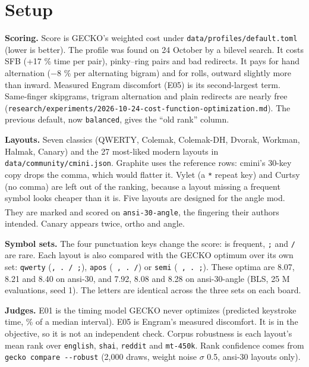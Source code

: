 \documentclass{gecko-paper}
\begin{document}
{\small
\section{Setup}

\textbf{Scoring.} Score is GECKO's weighted cost under \texttt{data/profiles/default.toml} (lower is better). The profile was found on 24 October by a bilevel search. It costs SFB (+17 \% time per pair), pinky–ring pairs and bad redirects. It pays for hand alternation ($-$8 \% per alternating bigram) and for rolls, outward slightly more than inward. Measured Engram discomfort (E05) is its
second-largest term. Same-finger skipgrams, trigram alternation and plain redirects are nearly free (\texttt{research/experiments/2026-10-24-cost-function-optimization.md}). The previous default, now \texttt{balanced}, gives the “old rank” column.

\textbf{Layouts.} Seven classics (QWERTY, Colemak, Colemak-DH, Dvorak, Workman, Halmak, Canary) and the 27 most-liked modern layouts in \texttt{data/community/cmini.json}. Graphite uses the reference rows: cmini's 30-key copy drops the comma, which would flatter it. Vylet (a \texttt{*} repeat key) and Curtsy (no comma) are left out of the ranking, because a layout missing a frequent symbol looks
cheaper than it is. Five layouts are designed for the angle mod. They are marked \textsuperscript{\dag} and scored on \texttt{ansi-30-angle}, the fingering their authors intended. Canary appears twice, ortho and angle.

\textbf{Symbol sets.} The four punctuation keys change the score: \texttt{\textquotesingle{}} is frequent, \texttt{;} and \texttt{/} are rare. Each layout is also compared with the GECKO optimum over its own set: \texttt{qwerty} (\texttt{,\ .\ /\ ;}), \texttt{apos} (\texttt{\textquotesingle{}\ ,\ .\ /}) or \texttt{semi} (\texttt{\textquotesingle{}\ ,\ .\ ;}). These optima are 8.07, 8.21 and 8.40
on ansi-30, and 7.92, 8.08 and 8.28 on ansi-30-angle (BLS, 25 M evaluations, seed 1). The letters are identical across the three sets on each board.

\textbf{Judges.} E01 is the timing model GECKO never optimizes (predicted keystroke time, \% of a median interval). E05 is Engram's measured discomfort. It is in the objective, so it is not an independent check. Corpus robustness is each layout's mean rank over \texttt{english}, \texttt{shai}, \texttt{reddit} and \texttt{mt-450k}. Rank confidence comes from \texttt{gecko\ compare\ -\/-robust}
(2,000 draws, weight noise $\sigma$ 0.5, ansi-30 layouts only).

}
\end{document}
